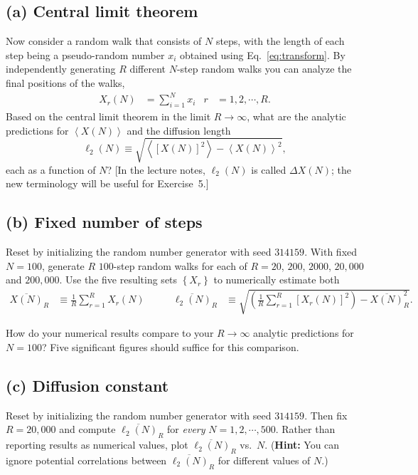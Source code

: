 \documentclass[12 pt]{article} %
\newcommand{\vev}[1]{\ensuremath{\left\langle #1 \right\rangle} }
\newcommand{\eq}[1]{Eq.~\ref{#1}}
\newcommand{\showmarks}[1]{\rightline{\texttt{[#1 marks]}}} %
\begin{document}
\subsection*{(a) Central limit theorem}
Now consider a random walk that consists of $N$ steps, with the length of each step being a pseudo-random number $x_i$ obtained using \eq{eq:transform}.
By independently generating $R$ different $N$-step random walks you can analyze the final positions of the walks,
\begin{align*}
  X_r(N) & = \sum_{i = 1}^N x_i &
  r & = 1, 2, \cdots, R.
\end{align*}
Based on the central limit theorem in the limit $R \to \infty$, what are the analytic predictions for $\vev{X(N)}$ and the diffusion length
\begin{equation*}
  \ell_2(N) \equiv \sqrt{\vev{\left[X(N)\right]^2} - \vev{X(N)}^2},
\end{equation*}
each as a function of $N$?
[In the lecture notes, $\ell_2(N)$ is called $\Delta X(N)$; the new terminology will be useful for Exercise~5.]

\showmarks{2}

\subsection*{(b) Fixed number of steps}
Reset by initializing the random number generator with seed $314159$.
With fixed $N = 100$, generate $R$ $100$-step random walks for each of $R = 20$, $200$, $2000$, $20{,}000$ and $200{,}000$.
Use the five resulting sets $\left\{X_r\right\}$ to numerically estimate both
\begin{align*}
  \overline{X(N)}_R & \equiv \frac{1}{R} \sum_{r = 1}^R X_r(N) \qquad &
  \overline{\ell_2(N)}_R & \equiv \sqrt{\left(\frac{1}{R} \sum_{r = 1}^R \left[X_r(N)\right]^2\right) - \overline{X(N)}_R^2}.
\end{align*}

How do your numerical results compare to your $R \to \infty$ analytic predictions for $N = 100$?
Five significant figures should suffice for this comparison.

\showmarks{8}

\subsection*{(c) Diffusion constant}
Reset by initializing the random number generator with seed $314159$.
Then fix $R = 20{,}000$ and compute $\overline{\ell_2(N)}_R$ for \textit{every} $N = 1, 2, \cdots, 500$.
Rather than reporting results as numerical values, plot $\overline{\ell_2(N)}_R$ vs.\ $N$.
(\textbf{Hint:} You can ignore potential correlations between $\overline{\ell_2(N)}_R$ for different values of $N$.)
\end{document}
